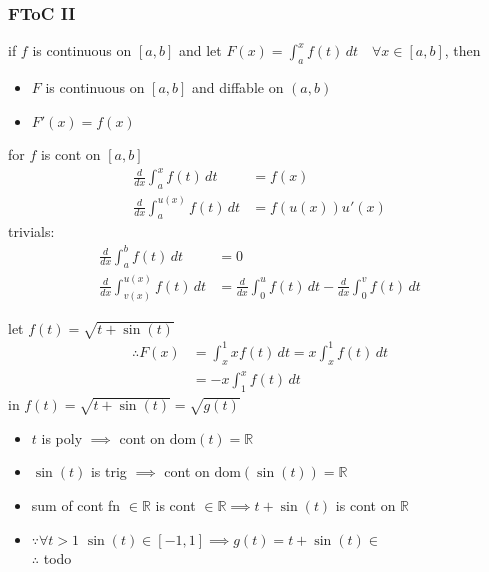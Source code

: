 		\subsubsection{FToC II}
			\begin{theorem}
				if $f$ is continuous on $[a,b]$ and let $\displaystyle F(x)=\int_a^x f(t)\,dt\quad\forall x\in[a,b]$, then
				\begin{itemize}
					\item $F$ is continuous on $[a,b]$ and diffable on $(a,b)$
					\item $F'(x)=f(x)$
				\end{itemize}
			\end{theorem}
			\begin{theorem}
				for $f$ is cont on $[a,b]$
				\begin{align*}
					\frac d{dx}\int_a^x f(t)\,dt&=f(x)\\
					\frac d{dx}\int_a^{u(x)} f(t)\,dt&=f(u(x))u'(x)\tag*{(chain rule)}
				\end{align*}
				trivials:
				\begin{align*}
					\frac d{dx}\int_a^b f(t)\,dt&=0\tag*{(deriv of constant)}\\
					\frac d{dx}\int_{v(x)}^{u(x)}f(t)\,dt&=\frac d{dx}\int_0^uf(t)\,dt-\frac d{dx}\int_0^vf(t)\,dt
				\end{align*}
			\end{theorem}
		    \begin{example}[find $\displaystyle F'(x)=\frac d{dx}\int_x^1x\sqrt{t+\sin(t)}\,dt$]
				let $f(t)=\sqrt{t+\sin(t)}$
				\begin{align*}
					\therefore F(x)&=\int_x^1xf(t)\,dt=x\int_x^1f(t)\,dt\tag*{($x$ is const wrt $t$)}\\
								   &=-x\int_1^xf(t)\,dt\tag*{($\int$ prop)}
				\end{align*}
				in $f(t)=\sqrt{t+\sin(t)}=\sqrt{g(t)}$
				\begin{itemize}
					\item $t$ is poly $\implies$ cont on $\mathrm{dom}(t)=\mathbb{R}$
					\item $\sin(t)$ is trig $\implies$ cont on $\mathrm{dom}(\sin(t))=\mathbb{R}$
					\item sum of cont fn $\in\mathbb{R}$ is cont $\in\mathbb{R}\implies t+\sin(t)$ is cont on $\mathbb{R}$
					\item $\because\forall t>1$ $\sin(t)\in[-1,1]\implies g(t)=t+\sin(t)\in$\\
						$\therefore$ todo
				\end{itemize}
		    \end{example}
